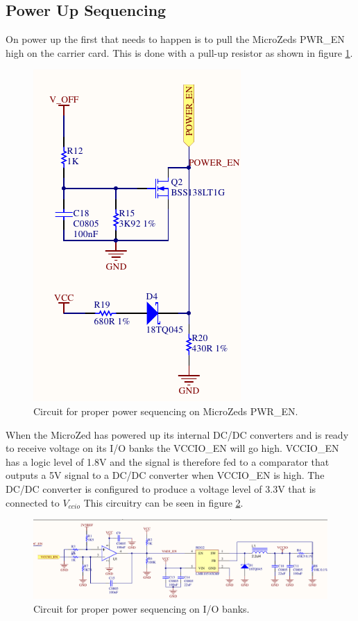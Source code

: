 \subsection{Power Up Sequencing}
On power up the first that needs to happen is to pull the MicroZeds PWR\_EN high on the carrier card.
This is done with a pull-up resistor as shown in figure \ref{fig:pwr_en_circuit}.

\begin{figure}
	\centering
	\includegraphics[width=.4\linewidth]{graphics/power_en_sch.pdf}
	\caption{Circuit for proper power sequencing on MicroZeds PWR\_EN.}
	\label{fig:pwr_en_circuit}
\end{figure}

When the MicroZed has powered up its internal DC/DC converters and is ready to receive voltage on its I/O banks the VCCIO\_EN will go high.
VCCIO\_EN has a logic level of 1.8V and the signal is therefore fed to a comparator that outputs a 5V signal to a DC/DC converter when VCCIO\_EN is high.
The DC/DC converter is configured to produce a voltage level of 3.3V that is connected to $V_{ccio}$
This circuitry can be seen in figure \ref{fig:pwr_io_circuit}.

\begin{figure}
	\centering
	\includegraphics[width=1\linewidth]{graphics/vccio_power_up.pdf}
	\caption{Circuit for proper power sequencing on I/O banks.}
	\label{fig:pwr_io_circuit}
\end{figure}


